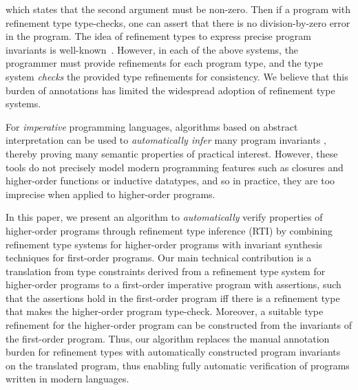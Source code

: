 \documentclass[nocopyrightspace]{sigplanconf}
\begin{document}
which states that the second argument must be non-zero.
Then if a program with refinement type type-checks, one can assert that there is no
division-by-zero error in the program.
The idea of refinement types to express precise program invariants is
well-known~\cite{XiPfenning99,Ou2004,ATS,Dunfield,Flanagan06,GordonRefinement09}.
However, in each of the above systems, the programmer must provide refinements for
each program type, and the type system {\em checks} the provided type refinements for
consistency.
We believe that this burden of annotations has limited the widespread adoption of refinement
type systems.

For {\em imperative} programming languages, algorithms based on abstract interpretation
can be used to {\em automatically infer} many program invariants 
\cite{SLAMPOPL02,HJMM04,CousotPLDI03}, thereby proving many semantic properties of practical interest.
However, these tools do not precisely model modern programming features such as closures
and higher-order functions or inductive datatypes, and so in practice, they
are too imprecise when applied to higher-order programs.

In this paper, we present an algorithm to {\em automatically} 
verify properties of higher-order programs through
refinement type inference (RTI) by
combining refinement type systems for higher-order programs
with invariant synthesis techniques for first-order programs.
Our main technical contribution is a translation 
from type constraints derived from a refinement type system for
higher-order programs to a first-order imperative program with assertions,
such that the assertions hold in the first-order program
iff there is a refinement type that makes the higher-order program
type-check.
Moreover, a suitable type refinement for the higher-order program
can be constructed from the invariants of the first-order program.
Thus, our algorithm replaces the manual annotation burden for refinement types with
automatically constructed program invariants on the translated program,
thus enabling fully automatic verification of programs written 
in modern languages.
\end{document}
